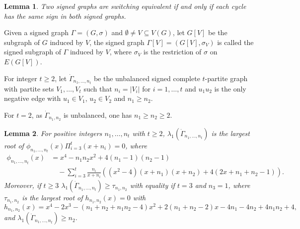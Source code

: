 \documentclass[12pt]{article}
\numberwithin{equation}{section}
\newtheorem {Lemma}{Lemma}[section]
\begin{document}
\begin{Lemma}\label{SE}\cite{Z1}
Two signed graphs  are switching equivalent if and only if each cycle has the same sign in both signed graphs.
\end{Lemma}







Given a signed graph $\Gamma=(G, \sigma)$ and $\emptyset\ne V\subseteq V(G)$, let $G[V]$ be the subgraph of $G$ induced by $V$,  the signed graph $\Gamma[V]=(G[V], \sigma_V)$ is called the signed subgraph of $\Gamma$  induced by $V$, where $\sigma_V$ is the restriction of $\sigma$ on $E(G[V])$.

For integer  $t\ge 2$, let $\dot\Gamma_{n_1, \dots, n_t}$ be the  unbalanced signed complete  $t$-partite graph with partite sets  $V_1, \dots, V_t$ such that $n_i=|V_i|$ for $i=1, \dots, t$ and  $u_1u_2$ is the only negative edge with  $u_1\in V_1$, $u_2\in V_2$ and $n_1\ge n_2$. 

 For $t=2$, as $\dot\Gamma_{n_1,  n_2}$ is  unbalanced, one has $n_1\ge n_2\ge 2$.

\begin{Lemma}\label{gnt} For positive integers $n_1,\dots, n_t$ with $t\ge 2$, 
$\lambda_1(\dot\Gamma_{n_1, \dots, n_t})$ is the largest root of $\phi_{n_1,\dots, n_t}(x)\Pi_{i=3}^t(x+n_i)=0$, where 
\begin{align*}\phi_{n_1,\dots, n_t}(x)&=x^4-n_1n_2x^2+4(n_1-1)(n_2-1) \\
& \quad -\sum_{i=3}^{t}\frac{n_i}{x+n_i}\left((x^2-4)(x+n_1)(x+n_2)+4(2x+n_1+n_2-1)\right). 
\end{align*} 
Moreover, if $t\ge 3$ $\lambda_1(\dot\Gamma_{n_1, \dots, n_t})\ge \tau_{n_1,n_2}$ with equality if $t=3$ and $n_3=1$, 
where $\tau_{n_1,n_2}$ is the largest root of $h_{n_1,n_2}(x)=0$ with 
\[
h_{n_1,n_2}(x)=x^4-2x^3-(n_1+n_2+n_1n_2-4)x^2+2(n_1+n_2-2)x-4n_1-4n_2+4n_1n_2+4, 
\]
and $\lambda_1(\dot\Gamma_{n_1, \dots, n_t})\ge n_2$. 
\end{Lemma}
\end{document}
